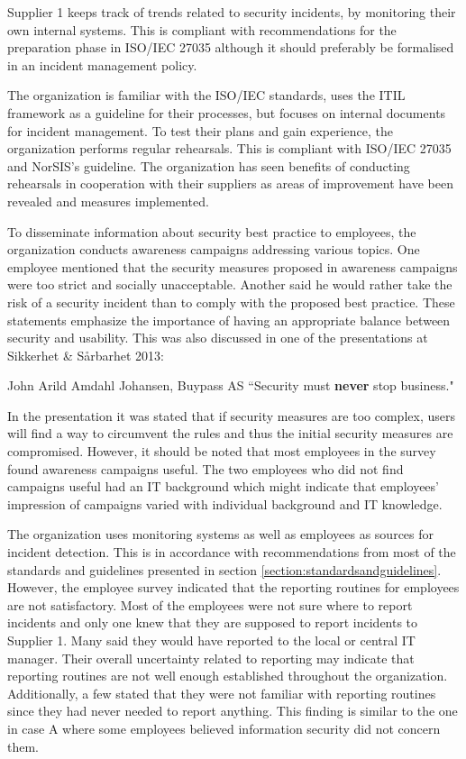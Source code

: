 Supplier 1 keeps track of trends related to security incidents, by monitoring their own internal systems. This is compliant with recommendations for the preparation phase in ISO/IEC 27035 although it should preferably be formalised in an incident management policy. 

The organization is familiar with the ISO/IEC standards, uses the ITIL framework as a guideline for their processes, but focuses on internal documents for incident management. To test their plans and gain experience, the organization performs regular rehearsals. This is compliant with ISO/IEC 27035 and NorSIS's guideline. The organization has seen benefits of conducting rehearsals in cooperation with their suppliers as areas of improvement have been revealed and measures implemented.   

To disseminate information about security best practice to employees, the organization conducts awareness campaigns addressing various topics. One employee mentioned that the security measures proposed in awareness campaigns were too strict and socially unacceptable. Another said he would rather take the risk of a security incident than to comply with the proposed best practice. These statements emphasize the importance of having an appropriate balance between security and usability. This was also discussed in one of the presentations at Sikkerhet \& S\aa rbarhet 2013:

\begin{newquote}{John Arild Amdahl Johansen, Buypass AS}
``Security must \textbf{never} stop business."
\end{newquote}

In the presentation it was stated that if security measures are too complex, users will find a way to circumvent the rules and thus the initial security measures are compromised. However, it should be noted that most employees in the survey found awareness campaigns useful. The two employees who did not find campaigns useful had an IT background which might indicate that employees' impression of campaigns varied with individual background and IT knowledge. 

The organization uses monitoring systems as well as employees as sources for incident detection. This is in accordance with recommendations from most of the standards and guidelines presented in section \ref{section:standardsandguidelines}. However, the employee survey indicated that the reporting routines for employees are not satisfactory. Most of the employees were not sure where to report incidents and only one knew that they are supposed to report incidents to Supplier 1. Many said they would have reported to the local or central IT manager. Their overall uncertainty related to reporting may indicate that reporting routines are not well enough established throughout the organization. Additionally, a few stated that they were not familiar with reporting routines since they had never needed to report anything. This finding is similar to the one in case A where some employees believed information security did not concern them. 

